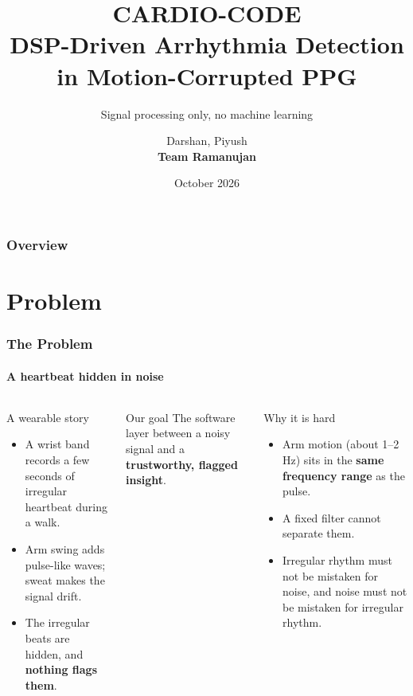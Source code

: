 \documentclass[t,aspectratio=169]{beamer}
\title[CARDIO-CODE]{CARDIO-CODE\\[1ex]\large DSP-Driven Arrhythmia Detection in Motion-Corrupted PPG}
\subtitle{Signal processing only, no machine learning}
\author[Team Ramanujan]{Darshan, Piyush\\[0.5ex]\textbf{Team Ramanujan}}
\institute[]{Milan 2K26}
\date{October 2026}
\newcommand*\lev{\item[\color{red}\scalebox{0.9}{\textbullet}]}
\begin{document}
\begin{frame}[plain]
\titlepage
\end{frame}

\begin{frame}
\frametitle{Overview}
\tableofcontents[hideallsubsections]
\end{frame}

\section{Problem}
\begin{frame}
\frametitle{The Problem}
\framesubtitle{A heartbeat hidden in noise}
\begin{columns}[T]
\begin{block}{A wearable story}
\begin{itemize}
  \item A wrist band records a few seconds of irregular heartbeat during a walk.
  \item Arm swing adds pulse-like waves; sweat makes the signal drift.
  \item The irregular beats are hidden, and \textbf{nothing flags them}.
\end{itemize}
\end{block}
\begin{exampleblock}{Our goal}
The software layer between a noisy signal and a \textbf{trustworthy, flagged insight}.
\end{exampleblock}
\begin{alertblock}{Why it is hard}
\begin{itemize}
  \lev Arm motion (about 1--2\,Hz) sits in the \textbf{same frequency range} as the pulse.
  \lev A fixed filter cannot separate them.
  \lev Irregular rhythm must not be mistaken for noise, and noise must not be mistaken for irregular rhythm.
\end{itemize}
\end{alertblock}
\end{columns}
\end{frame}
\end{document}

